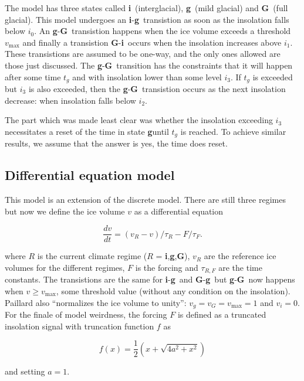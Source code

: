 \newcommand{\inter}{\textbf{i}}
\newcommand{\mild}{\textbf{g}}
\newcommand{\full}{\textbf{G}}

The model has three states called \inter~(interglacial), \mild~(mild glacial) and \full~(full glacial).
This model undergoes an \inter-\mild~transistion as soon as the insolation falls below $i_0$.
An \mild-\full~transistion happens when the ice volume exceeds a threshold $v_\text{max}$ and finally a transistion \full-\inter~occurs when the insolation increases above $i_1$.
These transistions are assumed to be one-way, and the only ones allowed are those just discussed.
The \mild-\full~transition has the constraints that it will happen after some time $t_g$ and with insolation lower than some level $i_3$.
If $t_g$ is exceeded but $i_3$ is also exceeded, then the \mild-\full~transistion occurs as the next insolation decrease: when insolation falls below $i_2$.

The part which was made least clear was whether the insolation exceeding $i_3$ necessitates a reset of the time in state \mild until $t_g$ is reached.
To achieve similar results, we assume that the answer is yes, the time does reset.



\subsection{Differential equation model}


This model is an extension of the discrete model.
There are still three regimes but now we define the ice volume $v$ as a differential equation

$$ \frac{dv}{dt} = (v_R - v) /\tau _R - F/\tau _F .$$

where $R$ is the current climate regime ($R$ = \inter,\mild,\full), $v_R$ are the reference ice volumes for the different regimes, $F$ is the forcing and $\tau _{R,F}$ are the time constants.
The transistions are the same for \inter-\mild~and \full-\mild~but \mild-\full~now happens when $v \geq v_\text{max}$, some threshold value (without any condition on the insolation).
Paillard also ``normalizes the ice volume to unity'': $v_g = v_G = v_\text{max} = 1$ and $v_i = 0$.
For the finale of model weirdness, the forcing $F$ is defined as a truncated insolation signal with truncation function $f$ as

$$ f(x) = \frac{1}{2} \left ( x + \sqrt{4a^2 + x^2} \right ) $$

and setting $a=1$.

